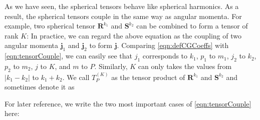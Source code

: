 As we have seen, the spherical tensors behave like spherical harmonics. As a result, the spherical tensors  
couple in the same way as angular momenta. For example, two spherical tensor $\mathbf{R}^{k_1}$ and  
$\mathbf{S}^{k_2}$ can be combined to form a tensor of rank $K$:
In practice, we can regard the above equation as the coupling of two angular momenta $\mathbf{j}_1$ and 
$\mathbf{j}_2$ to form $\mathbf{j}$. Comparing \autoref{eqn:defCGCoeffs} with \autoref{eqn:tensorCouple}, we can easily see that $j_1$ corresponds to $k_1$, $p_1$ to $m_1$, $j_2$ to $k_2$, $p_2$ to $m_2$,
$j$ to $K$, and $m$ to $P$. Similarly, $K$ can only takes the values from $|k_1 - k_2|$ to $k_1 + k_2$. We call 
$T_{P}^{(K)}$ as the tensor product of $\mathbf{R}^{k_1}$ and  $\mathbf{S}^{k_2}$ and sometimes denote it as

For later reference, we write the two most important cases of \autoref{eqn:tensorCouple} here:


